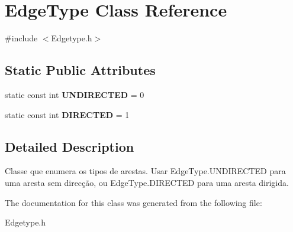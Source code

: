 \hypertarget{class_edge_type}{}\section{Edge\+Type Class Reference}
\label{class_edge_type}


{\ttfamily \#include $<$Edgetype.\+h$>$}

\subsection*{Static Public Attributes}
\begin{DoxyCompactItemize}
\item 
\mbox{\label{class_edge_type_a6533cc56d05c288a550b9980b66c9317}} 
static const int {\bfseries U\+N\+D\+I\+R\+E\+C\+T\+ED} = 0
\item 
\mbox{\label{class_edge_type_a903017a534f2818c2d17145e4ae0321c}} 
static const int {\bfseries D\+I\+R\+E\+C\+T\+ED} = 1
\end{DoxyCompactItemize}


\subsection{Detailed Description}
Classe que enumera os tipos de arestas. Usar Edge\+Type.\+U\+N\+D\+I\+R\+E\+C\+T\+ED para uma aresta sem direcção, ou Edge\+Type.\+D\+I\+R\+E\+C\+T\+ED para uma aresta dirigida. 

The documentation for this class was generated from the following file\+:\begin{DoxyCompactItemize}
\item 
Edgetype.\+h\end{DoxyCompactItemize}
